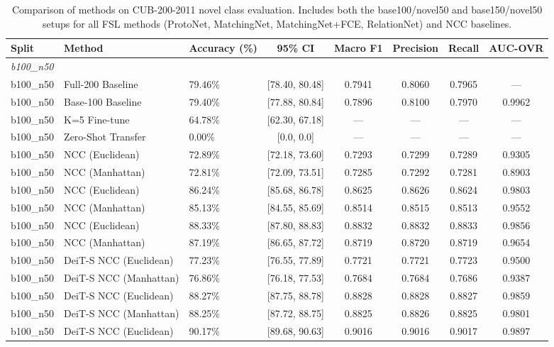 \begin{table}[htbp]
\centering
\caption{Comparison of methods on CUB-200-2011 novel class evaluation. Includes both the base100/novel50 and base150/novel50 setups for all FSL methods (ProtoNet, MatchingNet, MatchingNet+FCE, RelationNet) and NCC baselines.}
\label{tab:cub_results_comparison}
\begin{tabular}{lllccccc}
\hline
\textbf{Split} & \textbf{Method} & \textbf{Accuracy (\%)} & \textbf{95\% CI} & \textbf{Macro F1} & \textbf{Precision} & \textbf{Recall} & \textbf{AUC-OVR} \\
\hline
\multicolumn{8}{l}{\textit{b100\_n50}} \\
b100\_n50 & Full-200 Baseline & 79.46\% & [78.40, 80.48] & 0.7941 & 0.8060 & 0.7965 & --- \\
b100\_n50 & Base-100 Baseline & 79.40\% & [77.88, 80.84] & 0.7896 & 0.8100 & 0.7970 & 0.9962 \\
b100\_n50 & K=5 Fine-tune & 64.78\% & [62.30, 67.18] & --- & --- & --- & --- \\
b100\_n50 & Zero-Shot Transfer & 0.00\% & [0.0, 0.0] & --- & --- & --- & --- \\
b100\_n50 & NCC (Euclidean) & 72.89\% & [72.18, 73.60] & 0.7293 & 0.7299 & 0.7289 & 0.9305 \\
b100\_n50 & NCC (Manhattan) & 72.81\% & [72.09, 73.51] & 0.7285 & 0.7292 & 0.7281 & 0.8903 \\
b100\_n50 & NCC (Euclidean) & 86.24\% & [85.68, 86.78] & 0.8625 & 0.8626 & 0.8624 & 0.9803 \\
b100\_n50 & NCC (Manhattan) & 85.13\% & [84.55, 85.69] & 0.8514 & 0.8515 & 0.8513 & 0.9552 \\
b100\_n50 & NCC (Euclidean) & 88.33\% & [87.80, 88.83] & 0.8832 & 0.8832 & 0.8833 & 0.9856 \\
b100\_n50 & NCC (Manhattan) & 87.19\% & [86.65, 87.72] & 0.8719 & 0.8720 & 0.8719 & 0.9654 \\
b100\_n50 & DeiT-S NCC (Euclidean) & 77.23\% & [76.55, 77.89] & 0.7721 & 0.7721 & 0.7723 & 0.9500 \\
b100\_n50 & DeiT-S NCC (Manhattan) & 76.86\% & [76.18, 77.53] & 0.7684 & 0.7684 & 0.7686 & 0.9387 \\
b100\_n50 & DeiT-S NCC (Euclidean) & 88.27\% & [87.75, 88.78] & 0.8828 & 0.8828 & 0.8827 & 0.9859 \\
b100\_n50 & DeiT-S NCC (Manhattan) & 88.25\% & [87.72, 88.75] & 0.8825 & 0.8826 & 0.8825 & 0.9801 \\
b100\_n50 & DeiT-S NCC (Euclidean) & 90.17\% & [89.68, 90.63] & 0.9016 & 0.9016 & 0.9017 & 0.9897 \\

\end{tabular}
\end{table}
